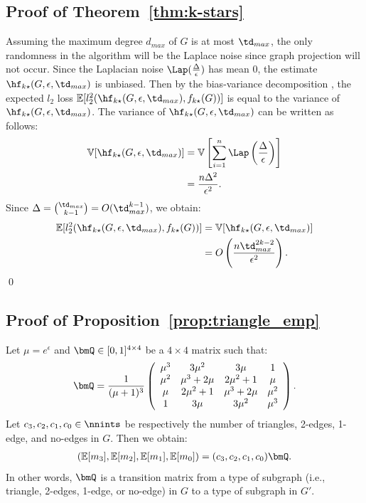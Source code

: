 \subsection{Proof of Theorem~\ref{thm:k-stars}}
Assuming the maximum degree $d_{max}$ of $G$ is at most $\td_{max}$, the only
randomness in the algorithm will be the Laplace noise since graph projection
will not occur.
Since the Laplacian noise $\Lap(\frac{\Delta}{\epsilon})$ has mean $0$, the estimate $\hf_{k\star}(G, \epsilon, \td_{max})$ is unbiased. 
Then by the bias-variance decomposition \cite{mlpp}, 
the expected $l_2$ loss 
$\mathbb{E}[l_2^2(\hf_{k\star}(G, \epsilon, \td_{max}),\allowbreak f_{k\star}(G))]$ is equal to the variance of $\hf_{k\star}(G, \epsilon, \td_{max})$. 
The variance of $\hf_{k\star}(G, \epsilon, \td_{max})$ can be written as follows:
\begin{align*}
    \mathbb{V}[\hf_{k\star}(G, \epsilon, \td_{max})] 
    &= \mathbb{V}\left[ \sum_{i=1}^n \Lap\left( \frac{\Delta}{\epsilon} \right) \right] \\
    &= \frac{n \Delta^2}{\epsilon^2}.
\end{align*}
Since $\Delta = \binom{\td_{max}}{k-1} = O(\td_{max}^{k-1})$, we obtain:
\begin{align*}
    \mathbb{E}[l_2^2(\hf_{k\star}(G, \epsilon, \td_{max}), f_{k\star}(G))] 
    &= \mathbb{V}[\hf_{k\star}(G, \epsilon, \td_{max})] \\
    &= O\left(\frac{n \td_{max}^{2k-2}}{\epsilon^2}\right).
\end{align*}
\qed

\subsection{Proof of Proposition~\ref{prop:triangle_emp}}
Let $\mu = e^\epsilon$ and $\bmQ \in [0,1]^{4 \times 4}$ be a $4 \times 4$ matrix such that:
\begin{align}
  \bmQ = \frac{1}{(\mu+1)^3} \left(
    \begin{array}{cccc}
      \mu^3 & 3\mu^2 & 3\mu & 1 \\
      \mu^2 & \mu^3+2\mu & 2\mu^2+1 & \mu \\
      \mu & 2\mu^2+1 & \mu^3+2\mu & \mu^2 \\
      1 & 3\mu & 3\mu^2 & \mu^3
    \end{array}
  \right).
  \label{eq:Q_1}
\end{align}
Let $c_3, c_2, c_1, c_0 \in \nnints$ be respectively the number of triangles, 2-edges, 1-edge, and no-edges in $G$. 
Then we obtain:
\begin{align}
(\mathbb{E}[m_3], \mathbb{E}[m_2], \mathbb{E}[m_1],
\mathbb{E}[m_0]) = (c_3, c_2, c_1, c_0) \bmQ.
\label{eq:bmQ}
\end{align}
In other words, $\bmQ$ is a transition matrix from a type of subgraph (i.e., triangle, 2-edges, 1-edge, or no-edge) in $G$ to a type of subgraph in $G'$. 


